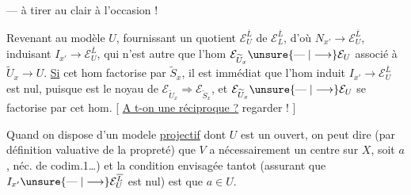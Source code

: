 --- à tirer au clair à l'occasion !

Revenant au modèle $U$, fournissant un quotient $\mathcal E_U^{\overline L}$ de $\mathcal E_L^{\overline L}$, d'où $N_{x'}\longrightarrow\mathcal E_U^{\overline L}$, induisant $I_{x'}\longrightarrow\mathcal E_U^{\overline L}$,
qui n'est autre que l'hom  $\mathcal E_{\widetilde U_x}\unsure{\mathrel{\text{---}}|\longrightarrow}\mathcal E_U$ associé à $\widetilde U_x\longrightarrow U$. \uline{Si} cet hom factorise par $\widetilde S_x$, il est immédiat que l'hom induit $I_{x'}\longrightarrow\mathcal E_U^{\overline L}$ est nul, puisque  est le noyau de $\mathcal E_{\widetilde U_x}\Longrightarrow\mathcal E_{\widetilde S_x}$, et $\mathcal E_{\widetilde U_x}\unsure{\mathrel{\text{---}}|\longrightarrow}\mathcal E_U$ se factorise par cet hom.
[ \uline{A t-on une réciproque ?} regarder ! ]

Quand on dispose d'un modele \uline{projectif} dont $U$ est un ouvert, on peut dire (par définition valuative de la propreté) que $V$ a nécessairement un centre sur $X$, soit $a$,   néc. de codim.1\ldots) et la condition envisagée tantot (assurant que $I_{x'}\unsure{\mathrel{\text{---}}|\longrightarrow}\mathcal E_U^{\overline L}$ est nul) est que $a\in U$.
